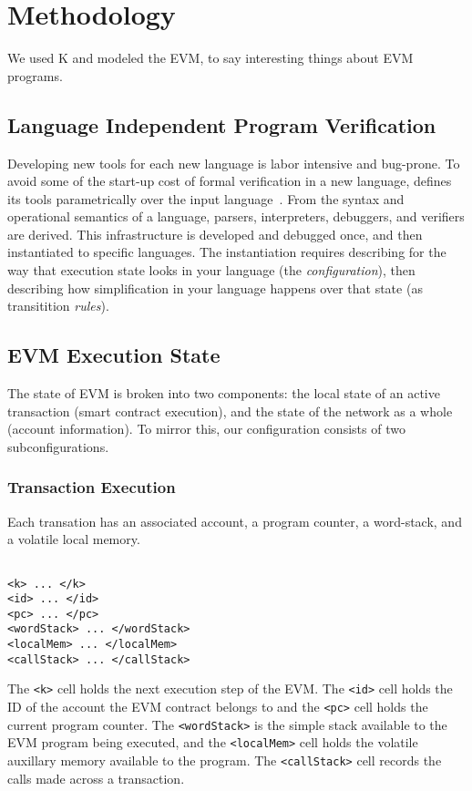 \section{Methodology}

We used K and modeled the EVM, to say interesting things about EVM programs.

\subsection{Language Independent Program Verification}

Developing new tools for each new language is labor intensive and bug-prone. To
avoid some of the start-up cost of formal verification in a new language, \K
defines its tools parametrically over the input language~\cite{inproceedings}.
From the syntax and operational semantics of a language, parsers, interpreters,
debuggers, and verifiers are derived. This infrastructure is developed and
debugged once, and then instantiated to specific languages. The instantiation
requires describing for \K the way that execution state looks in your language
(the \textit{configuration}), then describing how simplification in your
language happens over that state (as transitition \textit{rules}).

\subsection{EVM Execution State}

The state of EVM is broken into two components: the local state of an active
transaction (smart contract execution), and the state of the network as a whole
(account information). To mirror this, our configuration consists of two
subconfigurations.

\subsubsection{Transaction Execution}

Each transation has an associated account, a program counter, a word-stack, and
a volatile local memory.

\begin{verbatim}

<k> ... </k>
<id> ... </id>
<pc> ... </pc>
<wordStack> ... </wordStack>
<localMem> ... </localMem>
<callStack> ... </callStack>

\end{verbatim}

The \texttt{<k>} cell holds the next execution step of the EVM.  The
\texttt{<id>} cell holds the ID of the account the EVM contract belongs to and
the \texttt{<pc>} cell holds the current program counter. The
\texttt{<wordStack>} is the simple stack available to the EVM program being
executed, and the \texttt{<localMem>} cell holds the volatile auxillary memory
available to the program. The \texttt{<callStack>} cell records the calls made
across a transaction.

